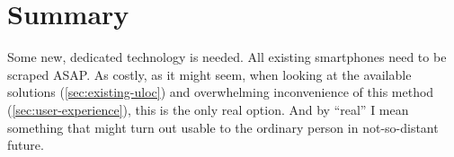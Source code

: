 \chapter{Summary}
\label{cha:summary}

Some new, dedicated technology is needed. All existing smartphones need to be scraped ASAP. As costly, as it might seem, when looking at the available solutions (\cref{sec:existing-uloc}) and overwhelming inconvenience of this method (\cref{sec:user-experience}), this is the only real option. And by ``real'' I mean something that might turn out usable to the ordinary person in not-so-distant future.